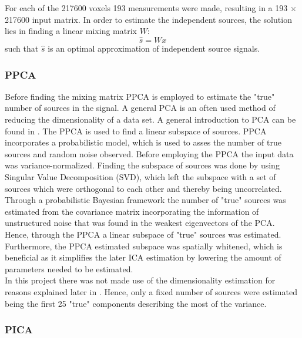 For each of the 217600 voxels 193 measurements were made, resulting in a 193 $\times$ 217600 input matrix. In order to estimate the independent sources, the solution lies in finding a linear mixing matrix $W$:
\begin{equation}
\widehat{s}= Wx
\end{equation}  
such that $\widehat{s}$ is an optimal approximation of independent source signals. 
\subsubsection{PPCA}

Before finding the mixing matrix PPCA is employed to estimate the "true" number of sources in the signal. A general PCA is an often used method of reducing the dimensionality of a data set. A general introduction to PCA can be found in . The PPCA is used to find a linear subspace of sources. PPCA incorporates a probabilistic model, which is used to asses the number of true sources and random noise observed. Before employing the PPCA the input data was variance-normalized. Finding the subspace of sources was done by using Singular Value Decomposition (SVD), which left the subspace with a set of sources which were orthogonal to each other and thereby being uncorrelated. Through a probabilistic Bayesian framework the number of "true" sources was estimated from the covariance matrix incorporating the information of unstructured noise that was found in the weakest eigenvectors of the PCA. Hence, through the PPCA a linear subspace of "true" sources was estimated. Furthermore, the PPCA estimated subspace was spatially whitened, which is beneficial as it simplifies the later ICA estimation by lowering the amount of parameters needed to be estimated.  \\
In this project there was not made use of the dimensionality estimation for reasons explained later in . Hence, only a fixed number of sources were estimated being the first 25 "true" components describing the most of the variance.

\subsubsection{PICA}

